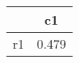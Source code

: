 \begin{table}[htbp]
\begin{tabular}{lc} \hline \hline
 & c1  \\  \hline 
r1 &     0.479 \\  
\hline \hline \end{tabular}
\end{table}
